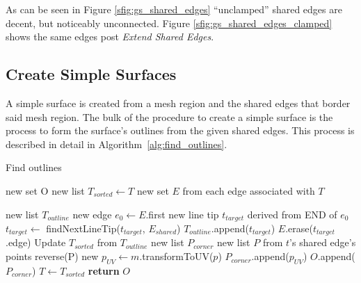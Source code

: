 As can be seen in Figure \ref{sfig:gs_shared_edges} ``unclamped'' shared edges are decent, but noticeably unconnected.
Figure \ref{sfig:gs_shared_edges_clamped} shows the same edges post \textit{Extend Shared Edges}.

\subsection{Create Simple Surfaces}
A simple surface is created from a mesh region and the shared edges that border said mesh region.
The bulk of the procedure to create a simple surface is the process to form the surface's outlines from the given shared edges.
This process is described in detail in Algorithm~\ref{alg:find_outlines}.

\begin{algorithm}[!htb]
	\caption{Find outlines}\label{alg:find_outlines}
\begin{algorithmic}[1]
	\State new set O 
	\State new list $T_{sorted} \leftarrow T$ 
	\State new set $E$ from each edge associated with $T$

		\State new list $T_{outline}$ 
		\State new edge $e_0 \leftarrow E$.first
		\State new line tip $t_{target}$ derived from END of $e_0$
		\Repeat
			\State $t_{target} \leftarrow$ findNextLineTip($t_{target}$, $E_{shared}$)
			\State $T_{outline}$.append($t_{target}$)
			\State $E$.erase($t_{target}$.edge)
		\State Update $T_{sorted}$ from $T_{outline}$
		\State new list $P_{corner}$
			\State new list $P$ from $t$'s shared edge's points
				\State reverse(P)
			\EndIf
				\State new $p_{UV} \leftarrow m$.transformToUV($p$)
				\State $P_{corner}$.append($p_{UV}$)
			\EndFor
		\EndFor
		\State $O$.append($P_{corner}$)
	\EndWhile
	\State $T \leftarrow T_{sorted}$
	\State \textbf{return} $O$
\EndFunction
\end{algorithmic}
\end{algorithm}


